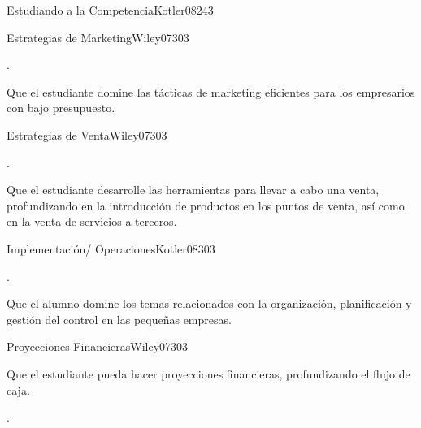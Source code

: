 \begin{syllabus}
\begin{unit}{Estudiando a la Competencia}{}{Kotler08}{24}{3}
\end{unit}

\begin{unit}{Estrategias de Marketing}{}{Wiley07}{30}{3}
   \begin{topics}
      \item . 
   \end{topics}

   \begin{learningoutcomes}
      \item Que el estudiante domine las tácticas de marketing eficientes para los empresarios con bajo presupuesto.
   \end{learningoutcomes}
\end{unit}

\begin{unit}{Estrategias de Venta}{}{Wiley07}{30}{3}
   \begin{topics}
      \item .
   \end{topics}

   \begin{learningoutcomes}
      \item Que el estudiante desarrolle las herramientas para llevar a cabo una venta, profundizando en la introducción de productos en los puntos de venta, así como en la venta de servicios a terceros.
   \end{learningoutcomes}
\end{unit}

\begin{unit}{Implementación/ Operaciones}{}{Kotler08}{30}{3}
   \begin{topics}
      \item . 
   \end{topics}

   \begin{learningoutcomes}
      \item Que el alumno domine los temas relacionados con la organización, planificación y gestión del control en las pequeñas empresas.
   \end{learningoutcomes}

\end{unit}

\begin{unit}{Proyecciones Financieras}{}{Wiley07}{30}{3}
   \begin{topics}
      \item Que el estudiante pueda hacer proyecciones financieras, profundizando el flujo de caja.
   \end{topics}

   \begin{learningoutcomes}
      \item .
   \end{learningoutcomes}
\end{unit}



\begin{coursebibliography}
\end{coursebibliography}

\end{syllabus}
